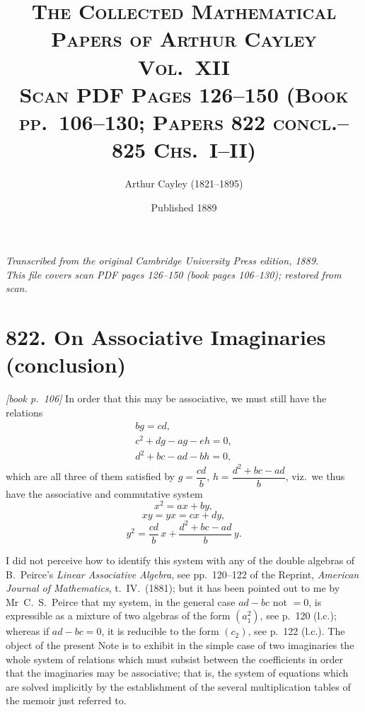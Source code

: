 \documentclass[11pt,a4paper]{article}
\theoremstyle{plain}
\theoremstyle{definition}
\theoremstyle{remark}
\begin{document}
\title{\scshape The Collected Mathematical Papers of Arthur Cayley\\Vol.\ XII\\[0.5em]\large Scan PDF Pages 126--150 (Book pp.\ 106--130; Papers 822 concl.--825 Chs.\ I--II)}
\author{Arthur Cayley (1821--1895)}
\date{Published 1889}
\maketitle

\thispagestyle{empty}
\begin{center}
\textit{Transcribed from the original Cambridge University Press edition, 1889.}\\
\textit{This file covers scan PDF pages 126--150 (book pages 106--130); restored from scan.}
\end{center}

\tableofcontents
\newpage

\section*{822. On Associative Imaginaries (conclusion)}

\noindent\textit{[book p.~106]} In order that this may be associative, we must still have the relations
\begin{gather*}
bg = cd, \\
c^2 + dg - ag - eh = 0, \\
d^2 + bc - ad - bh = 0,
\end{gather*}
which are all three of them satisfied by $g = \dfrac{cd}{b}$, $h = \dfrac{d^2 + bc - ad}{b}$, viz.\ we thus have the associative and commutative system
\[
x^2 = ax + by,
\]
\[
xy = yx = cx + dy,
\]
\[
y^2 = \frac{cd}{b}\,x + \frac{d^2 + bc - ad}{b}\,y.
\]

I did not perceive how to identify this system with any of the double algebras of B.\ Peirce's \textit{Linear Associative Algebra}, see pp.\ 120--122 of the Reprint, \textit{American Journal of Mathematics}, t.\ IV.\ (1881); but it has been pointed out to me by Mr~C.\ S.\ Peirce that my system, in the general case $ad - bc$ not $= 0$, is expressible as a mixture of two algebras of the form $(a_1^2)$, see p.~120 (l.c.); whereas if $ad - bc = 0$, it is reducible to the form $(c_2)$, see p.~122 (l.c.). The object of the present Note is to exhibit in the simple case of two imaginaries the whole system of relations which must subsist between the coefficients in order that the imaginaries may be associative; that is, the system of equations which are solved implicitly by the establishment of the several multiplication tables of the memoir just referred to.
\end{document}
